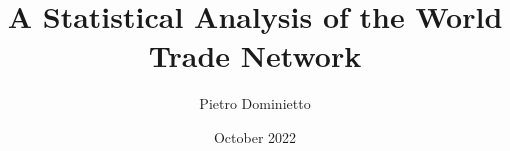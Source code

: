 \documentclass[a4paper,12pt]{report}
\title{A Statistical Analysis of the World Trade Network}
\author{Pietro Dominietto}
\date{October 2022}
\begin{document}
\maketitle


\begin{singlespace}

\tableofcontents

\listoftables
\listoffigures
\end{singlespace}
\pagebreak







\begin{singlespace}
% 
\printbibliography[heading=bibintoc,title={Bibliography}]

\appendix

\end{singlespace}
\end{document}
